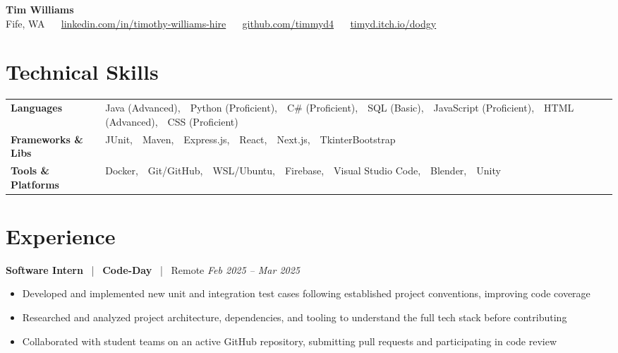 \documentclass[10pt, letterpaper]{article}
\newcommand{\jobhead}[4]{%
  \vspace{5pt}%
  {\bfseries\color{dark}#1}%
  ~{\color{light}|}~%
  {\bfseries\color{navy}#2}%
  ~{\color{light}|}~%
  {\color{light}#3}%
  \hfill{\color{light}\small\textit{#4}}\\[-2pt]%
}
\newcommand{\skillrow}[2]{%
  {\bfseries #1} & #2 \\[2pt]%
}
\begin{document}

\begin{center}
  {\huge\bfseries\color{navy} Tim Williams}\\[4pt]
  {\small\color{light}
    Fife, WA
    ~\textbullet~
    \href{https://linkedin.com/in/timothy-williams-hire}{linkedin.com/in/timothy-williams-hire}
    ~\textbullet~
    \href{https://github.com/timmyd4}{github.com/timmyd4}
    ~\textbullet~
    \href{https://timyd.itch.io/dodgy}{timyd.itch.io/dodgy}
  }
\end{center}

\vspace{2pt}

\section{Technical Skills}

\begin{tabular}{@{}p{1.6in} p{5.2in}@{}}
  \skillrow{Languages}{Java (Advanced),\ \ Python (Proficient),\ \ C\# (Proficient),\ \ SQL (Basic),\ \ JavaScript (Proficient),\ \ HTML (Advanced),\ \ CSS (Proficient)}
  \skillrow{Frameworks \& Libs}{JUnit,\ \ Maven,\ \ Express.js,\ \ React,\ \ Next.js,\ \ TkinterBootstrap}
  \skillrow{Tools \& Platforms}{Docker,\ \ Git/GitHub,\ \ WSL/Ubuntu,\ \ Firebase,\ \ Visual Studio Code,\ \ Blender,\ \ Unity}
\end{tabular}

\section{Experience}

\jobhead{Software Intern}{Code-Day}{Remote}{Feb 2025 – Mar 2025}
\begin{itemize}
  \item Developed and implemented new unit and integration test cases following established project conventions, improving code coverage
  \item Researched and analyzed project architecture, dependencies, and tooling to understand the full tech stack before contributing
  \item Collaborated with student teams on an active GitHub repository, submitting pull requests and participating in code review
\end{itemize}
\end{document}
